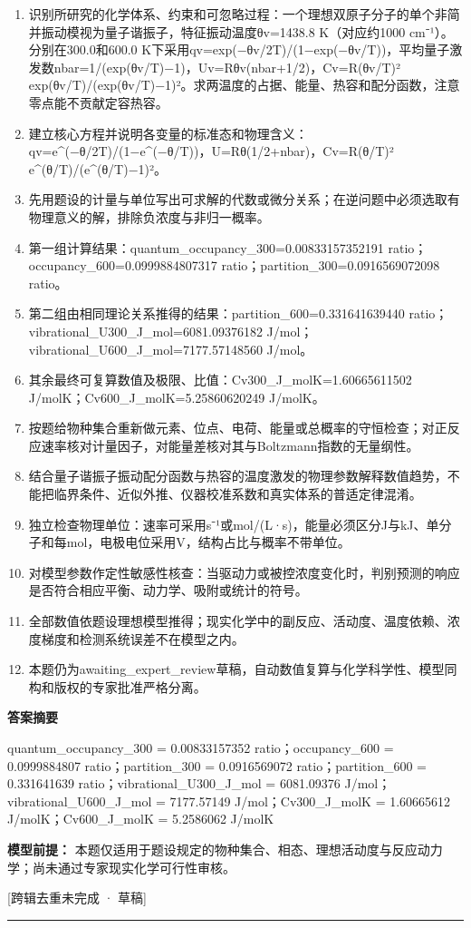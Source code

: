 \documentclass[UTF8,11pt,a4paper]{ctexart}
\begin{document}
\begin{enumerate}
\item 识别所研究的化学体系、约束和可忽略过程：一个理想双原子分子的单个非简并振动模视为量子谐振子，特征振动温度θv=1438.8 K（对应约1000 cm⁻¹）。分别在300.0和600.0 K下采用qv=exp(−θv/2T)/(1−exp(−θv/T))，平均量子激发数nbar=1/(exp(θv/T)−1)，Uv=Rθv(nbar+1/2)，Cv=R(θv/T)² exp(θv/T)/(exp(θv/T)−1)²。求两温度的占据、能量、热容和配分函数，注意零点能不贡献定容热容。
\item 建立核心方程并说明各变量的标准态和物理含义：qv=e\textasciicircum{}(−θ/2T)/(1−e\textasciicircum{}(−θ/T))，U=Rθ(1/2+nbar)，Cv=R(θ/T)² e\textasciicircum{}(θ/T)/(e\textasciicircum{}(θ/T)−1)²。
\item 先用题设的计量与单位写出可求解的代数或微分关系；在逆问题中必须选取有物理意义的解，排除负浓度与非归一概率。
\item 第一组计算结果：quantum\_occupancy\_300=0.00833157352191 ratio；occupancy\_600=0.0999884807317 ratio；partition\_300=0.0916569072098 ratio。
\item 第二组由相同理论关系推得的结果：partition\_600=0.331641639440 ratio；vibrational\_U300\_J\_mol=6081.09376182 J/mol；vibrational\_U600\_J\_mol=7177.57148560 J/mol。
\item 其余最终可复算数值及极限、比值：Cv300\_J\_molK=1.60665611502 J/molK；Cv600\_J\_molK=5.25860620249 J/molK。
\item 按题给物种集合重新做元素、位点、电荷、能量或总概率的守恒检查；对正反应速率核对计量因子，对能量差核对其与Boltzmann指数的无量纲性。
\item 结合量子谐振子振动配分函数与热容的温度激发的物理参数解释数值趋势，不能把临界条件、近似外推、仪器校准系数和真实体系的普适定律混淆。
\item 独立检查物理单位：速率可采用s⁻¹或mol/(L·s)，能量必须区分J与kJ、单分子和每mol，电极电位采用V，结构占比与概率不带单位。
\item 对模型参数作定性敏感性核查：当驱动力或被控浓度变化时，判别预测的响应是否符合相应平衡、动力学、吸附或统计的符号。
\item 全部数值依题设理想模型推得；现实化学中的副反应、活动度、温度依赖、浓度梯度和检测系统误差不在模型之内。
\item 本题仍为awaiting\_expert\_review草稿，自动数值复算与化学科学性、模型同构和版权的专家批准严格分离。
\end{enumerate}
\noindent\textbf{答案摘要}\par
quantum\_occupancy\_300 = 0.00833157352 ratio；occupancy\_600 = 0.0999884807 ratio；partition\_300 = 0.0916569072 ratio；partition\_600 = 0.331641639 ratio；vibrational\_U300\_J\_mol = 6081.09376 J/mol；vibrational\_U600\_J\_mol = 7177.57149 J/mol；Cv300\_J\_molK = 1.60665612 J/molK；Cv600\_J\_molK = 5.2586062 J/molK\par
\noindent\textbf{模型前提：}
本题仅适用于题设规定的物种集合、相态、理想活动度与反应动力学；尚未通过专家现实化学可行性审核。\par
\noindent\textcolor{red!65!black}{[跨辑去重未完成 · 草稿]} \par
\medskip\hrule\medskip
{}
\end{document}
